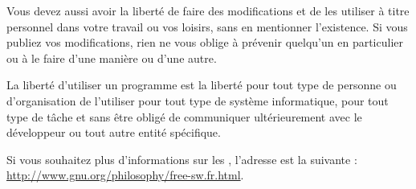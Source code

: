 Vous devez aussi avoir la liberté de faire des modifications et de les utiliser à titre personnel dans votre travail ou vos loisirs, sans en mentionner l'existence. Si vous publiez vos modifications, rien ne vous oblige à prévenir quelqu'un en particulier ou à le faire d'une manière ou d'une autre.\par
La liberté d'utiliser un programme est la liberté pour tout type de personne ou d'organisation de l'utiliser pour tout type de système informatique, pour tout type de tâche et sans être obligé de communiquer ultérieurement avec le développeur ou tout autre entité spécifique.\par
Si vous souhaitez plus d'informations sur les , l'adresse est la suivante : \url{http://www.gnu.org/philosophy/free-sw.fr.html}.
\newpage
